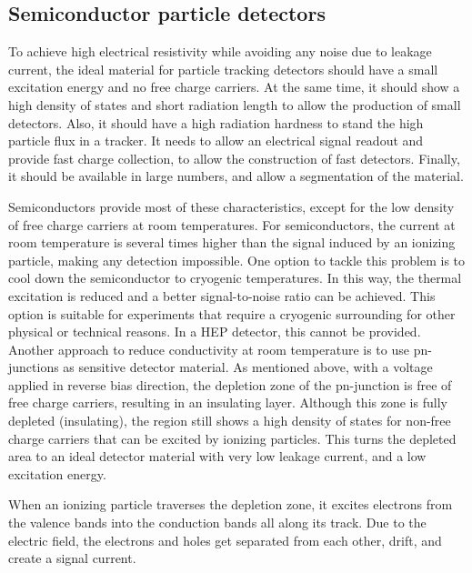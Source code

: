  
\subsection{Semiconductor particle detectors}\label{sec:semi_as_detector}
To achieve high electrical resistivity while avoiding any noise due to leakage current, the ideal material for particle tracking detectors should have a small excitation energy and no free charge carriers. At the same time, it should show a high density of states and short radiation length to allow the production of small detectors. Also, it should have a high radiation hardness to stand the high particle flux in a tracker. It needs to allow an electrical signal readout and provide fast charge collection, to allow the construction of fast detectors. Finally, it should be available in large numbers, and allow a segmentation of the material.

Semiconductors provide most of these characteristics, except for the low density of free charge carriers at room temperatures. For semiconductors, the current at room temperature is several times higher than the signal induced by an ionizing particle, making any detection impossible. One option to tackle this problem is to cool down the semiconductor to cryogenic temperatures. In this way, the thermal excitation is reduced and a better signal-to-noise ratio can be achieved. This option is suitable for experiments that require a cryogenic surrounding for other physical or technical reasons. In a \ac{HEP} detector, this cannot be provided. Another approach to reduce conductivity at room temperature is to use pn-junctions as sensitive detector material. As mentioned above, with a voltage applied in reverse bias direction, the depletion zone of the pn-junction is free of free charge carriers, resulting in an insulating layer. Although this zone is fully depleted (insulating), the region still shows a high density of states for non-free charge carriers that can be excited by ionizing particles. This turns the depleted area to an ideal detector material with very low leakage current, and a low excitation energy.

When an ionizing particle traverses the depletion zone, it excites electrons from the valence bands into the conduction bands all along its track. Due to the electric field, the electrons and holes get separated from each other, drift, and create a signal current.


